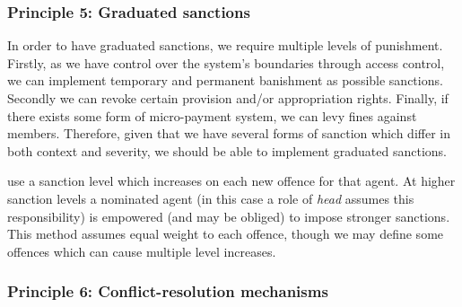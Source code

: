 



\subsubsection*{Principle 5: Graduated sanctions}

In order to have graduated sanctions, we require multiple levels of punishment. 
Firstly, as we have control over the system's boundaries through access control, we can implement temporary and permanent banishment as possible sanctions. 
Secondly we can revoke certain provision and/or appropriation rights. Finally, if there exists some form of micro-payment system, we can levy fines against members. 
Therefore, given that we have several forms of sanction which differ in both context and severity, we should be able to implement graduated sanctions. 

 use a sanction level which increases on each new offence for that agent.
At higher sanction levels a nominated agent (in this case a role of \emph{head} assumes this responsibility) is empowered (and may be obliged) to impose stronger sanctions. 
This method assumes equal weight to each offence, though we may define some offences which can cause multiple level increases. 

\subsubsection*{Principle 6: Conflict-resolution mechanisms}

